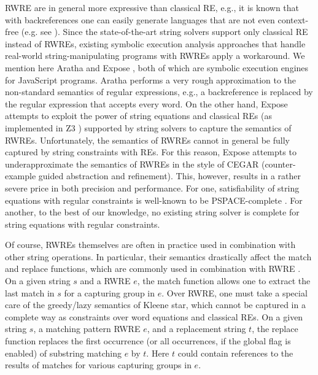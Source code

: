 RWRE are in general more expressive than classical RE, e.g., it is known that
with backreferences one can easily generate languages that are not even 
context-free (e.g. see \cite{FS19}). %
Since the state-of-the-art string solvers support only classical RE instead of
RWREs, %
existing symbolic execution analysis approaches that handle real-world
string-manipulating programs with RWREs apply a workaround.
We mention here Aratha \cite{aratha} and Expose \cite{LMK19}, both of which are
symbolic execution engines for JavaScript programs.
Aratha performs a very rough approximation to the 
non-standard semantics of regular expressions, e.g., a backreference
is replaced by the regular expression that accepts every word.
On the other hand, Expose attempts to exploit the power of string 
equations and classical REs (as implemented in Z3 \cite{Z3}) supported by string
solvers to capture the 
semantics of RWREs. Unfortunately, the semantics of RWREs cannot 
in general be fully captured by string constraints with REs. 
For this reason, 
Expose attempts to underapproximate the semantics of RWREs in the style of 
CEGAR (counter-example guided abstraction and refinement). This, however,
results in a rather severe price in both precision and performance. For one,
satisfiability of string equations with regular constraints is
well-known to be PSPACE-complete \cite{J16,Kozen77,P04}. For another, to the 
best of our knowledge, no existing string solver is complete for string 
equations with regular
constraints.

Of course, RWREs themselves are often in practice used in combination with
other string operations. In particular, their semantics drastically affect
the match and replace functions, which are commonly used in combination with
RWRE \cite{LMK19}. On a given string $s$ and a RWRE $e$, the match
function allows one to extract the last match in $s$ for a 
capturing group in $e$. Over RWRE, one must take a special care of the
greedy/lazy semantics of Kleene star, which cannot 
be captured in a complete way as constraints over word equations and classical 
REs. On a given string $s$, a matching pattern RWRE $e$, and a replacement 
string $t$, the replace function replaces the first occurrence (or all 
occurrences,
if the global flag is enabled) of substring matching $e$ by $t$. Here $t$
could contain references to the results of matches for various capturing groups
in $e$. 


